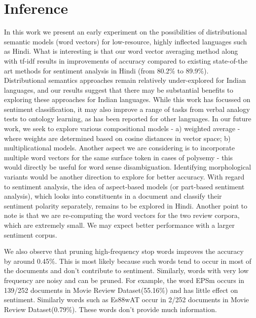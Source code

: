 	\section{Inference}
		In this work we present an early experiment on the possibilities of distributional semantic models (word vectors) for low-resource, highly inflected languages such as Hindi.  What is interesting is that our word vector averaging method along with tf-idf results in improvements of accuracy compared to existing state-of-the art methods for sentiment analysis in Hindi (from 80.2\% to 89.9\%).
Distributional semantics approaches remain relatively under-explored for Indian languages, and our results suggest that there may be substantial benefits to exploring these approaches for Indian languages.  While this work has focussed on sentiment classification, it may also improve a range of tasks from verbal analogy tests to ontology learning, as has been reported for other languages.
In our future work, we seek to explore various compositional models - a) weighted average - where weights are determined based on cosine distances in vector space;  b) multiplicational models. Another aspect we are considering is to incorporate multiple word vectors for the same surface token in cases of polysemy - this would directly be useful for word sense disambiguation.  Identifying morphological variants would be another direction to explore for better accuracy. With regard to sentiment analysis, the idea of aspect-based models (or part-based sentiment analysis), which looks into constituents in a document and classify their sentiment polarity separately, remains to be explored in Hindi. Another point to note is that we are re-computing the word vectors
for the two review corpora, which are extremely small.  We may expect better performance  with a larger sentiment corpus.

We also observe that pruning high-frequency stop words improves the accuracy by around 0.45\%. This is most likely  because such words tend to occur in most of the documents and don't contribute to sentiment.  Similarly, words with very low frequency are noisy and can be pruned. For example, the word {\dn EPSm} occurs in 139/252 documents in Movie Review Dataset(55.16\%) and has little effect on sentiment.
Similarly words such as {\dn Es\388wAT\0} occur in 2/252 documents in Movie Review Dataset(0.79\%). These words don't provide much information.\\ 

